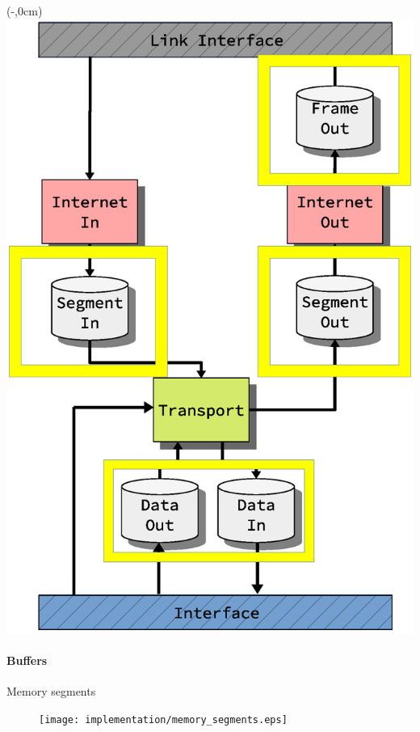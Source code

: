 \begin{frame}[fragile]
    \begin{textblock*}{\displayThumbnail}(\paperwidth-\displayThumbnail-0.2cm,0cm) %
        \colorbox{white}{\includegraphics[width=\textwidth]{implementation/design_2_memory.eps}}
    \end{textblock*}
    \frametitle{\ImplementationTitle}
    \framesubtitle{Buffers}
    Memory segments\\
    \begin{minipage}[t]{1\textwidth}
        \begin{figure}
                \centering
                \texttt{[image: implementation/memory\_segments.eps]}
        \end{figure}
    \end{minipage}
\end{frame}


